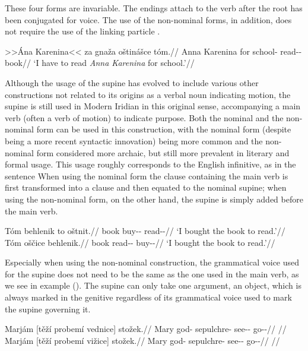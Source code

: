 These four forms are invariable. The endings attach to the verb after the root
has been conjugated for voice. The use of the non-nominal forms, in addition,
does not require the use of the linking particle .

\pex
\begingl
\gla >>Ána Karenina<< za gnaža oštinášce tóm.//
\glb Anna Karenina for school-\Acc{} read-\Pv{}-\SupN{} book//
\glft `I have to read \textit{Anna Karenina} for school.'//
\endgl
\xe

Although the usage of the supine has evolved to include various other
constructions not related to its origins as a verbal noun indicating motion, the
supine is still used in Modern Iridian in this original sense, accompanying a
main verb (often a verb of motion) to indicate purpose. Both the nominal and the
non-nominal form can be used in this construction, with the nominal form
(despite being a more recent syntactic innovation) being more common and the
non-nominal form considered more archaic, but still more prevalent in literary
and formal usage. This usage roughly corresponds to the English infinitive, as
in the sentence  When using the nominal
form the clause containing the main verb is first transformed into a
clause and then equated to the nominal supine; when using the
non-nominal form, on the other hand, the supine is simply added before the main
verb.

\pex
\a
\begingl
\gla Tóm behlenik to oštnit.//
\glb book buy-\Pv{}-\Pf{} \Rz{} read-\Pv{}-\SupP{}//
\glft `I bought the book to read.'//
\endgl
\a
\begingl
\gla Tóm oščice behlenik.//
\glb book read-\Av{}-\SupP{} buy-\Pv{}-\Pf{}//
\glft `I bought the book to read.'//
\endgl
\xe

Especially when using the non-nominal construction, the grammatical voice used
for the supine does not need to be the same as the one used in the main verb, as
we see in example (). The supine can only take one
argument, an object, which is always marked in the genitive regardless of its
grammatical voice used to mark the supine governing it.

\pex
\a\begingl
\gla Marjám [těží probemí vednice] stožek.//
\glb Mary god-\Gen{} sepulchre-\Gen{} see-\Pv{}-\SupP{} go-\Av{}-\Pf{}//
\glft {}//
\endgl
\a\begingl
\gla Marjám [těží probemí vižice] stožek.//
\glb Mary god-\Gen{} sepulchre-\Gen{} see-\Av{}-\SupP{} go-\Av{}-\Pf{}//
\glft {}//
\endgl
\xe

